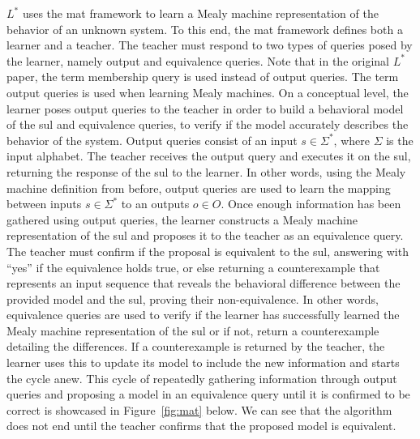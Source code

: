 $L^*$ uses the \ac{mat} framework to learn a Mealy machine representation of the behavior of an unknown system. To this end, the \ac{mat} framework defines both a learner and a teacher. The teacher must respond to two types of queries posed by the learner, namely output and equivalence queries. Note that in the original $L^*$ paper, the term membership query is used instead of output queries. The term output queries is used when learning Mealy machines. On a conceptual level, the learner poses output queries to the teacher in order to build a behavioral model of the \ac{sul} and equivalence queries, to verify if the model accurately describes the behavior of the system. Output queries consist of an input $s \in \Sigma^*$, where $\Sigma$ is the input alphabet. The teacher receives the output query and executes it on the \ac{sul}, returning the response of the \ac{sul} to the learner. In other words, using the Mealy machine definition from before, output queries are used to learn the mapping between inputs $s \in \Sigma^*$ to an outputs $o \in O$. Once enough information has been gathered using output queries, the learner constructs a Mealy machine representation of the \ac{sul} and proposes it to the teacher as an equivalence query. The teacher must confirm if the proposal is equivalent to the \ac{sul}, answering with  ``yes'' if the equivalence holds true, or else returning a counterexample that represents an input sequence that reveals the behavioral difference between the provided model and the \ac{sul}, proving their non-equivalence. In other words, equivalence queries are used to verify if the learner has successfully learned the Mealy machine representation of the \ac{sul} or if not, return a counterexample detailing the differences. If a counterexample is returned by the teacher, the learner uses this to update its model to include the new information and starts the cycle anew. This cycle of repeatedly gathering information through output queries and proposing a model in an equivalence query until it is confirmed to be correct is showcased in Figure~\ref{fig:mat} below. We can see that the algorithm does not end until the teacher confirms that the proposed model is equivalent.

